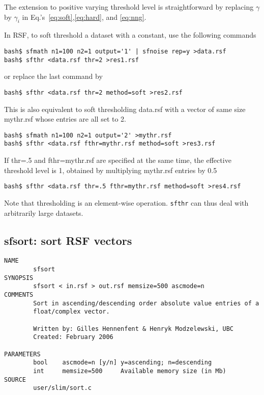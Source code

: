 
The extension to positive varying threshold level is straightforward
by replacing $\gamma$ by $\gamma_i$ in
Eq.'s~\eqref{eq:soft},\eqref{eq:hard}, and \eqref{eq:nng}.

In RSF, to soft threshold a dataset with a constant, use the following
commands
%
\begin{verbatim}
bash$ sfmath n1=100 n2=1 output='1' | sfnoise rep=y >data.rsf
bash$ sfthr <data.rsf thr=2 >res1.rsf
\end{verbatim}
%
or replace the last command by
%
\begin{verbatim}
bash$ sfthr <data.rsf thr=2 method=soft >res2.rsf
\end{verbatim}
%
This is also equivalent to soft thresholding data.rsf with a vector of
same size mythr.rsf whose entries are all set to 2.
%
\begin{verbatim}
bash$ sfmath n1=100 n2=1 output='2' >mythr.rsf
bash$ sfthr <data.rsf fthr=mythr.rsf method=soft >res3.rsf
\end{verbatim}
%
If thr=.5 and fthr=mythr.rsf are specified at the same time, the
effective threshold level is 1, obtained by multiplying mythr.rsf
entries by 0.5
%
\begin{verbatim}
bash$ sfthr <data.rsf thr=.5 fthr=mythr.rsf method=soft >res4.rsf
\end{verbatim}


Note that thresholding is an element-wise operation. \texttt{sfthr}
can thus deal with arbitrarily large datasets.
%
\newpage
\subsection{sfsort: sort RSF vectors}

\begin{verbatim}
NAME
        sfsort
SYNOPSIS
        sfsort < in.rsf > out.rsf memsize=500 ascmode=n
COMMENTS
        Sort in ascending/descending order absolute value entries of a
        float/complex vector.
        
        Written by: Gilles Hennenfent & Henryk Modzelewski, UBC
        Created: February 2006
        
PARAMETERS
        bool    ascmode=n [y/n] y=ascending; n=descending 
        int     memsize=500     Available memory size (in Mb)
SOURCE
        user/slim/sort.c
\end{verbatim}

